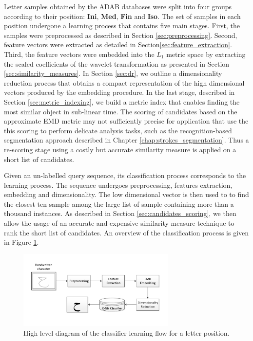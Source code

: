 \iftoggle{edit-mode}{\hspace{0pt}\marginpar{The learning process}}{}
Letter samples obtained by the ADAB databases were split into four groups according to their position: \textbf{Ini}, \textbf{Med}, \textbf{Fin} and \textbf{Iso}. 
The set of samples in each position undergone a learning process that contains five main stages.
First, the samples were preprocessed as described in Section \ref{sec:preprocessing}.
Second, feature vectors were extracted as detailed in Section\ref{sec:feature_extraction}.
Third, the feature vectors were embedded into the $L_1$ metric space by extracting the scaled coefficients of the wavelet transformation as presented in Section \ref{sec:similarity_measures}. 
In Section \ref{sec:dr}, we outline a dimensionality reduction process that obtains a compact representation of the high dimensional vectors produced by the embedding procedure.
In the last stage, described in Section \ref{sec:metric_indexing}, we build a metric index that enables finding the most similar object in sub-linear time.
The scoring of candidates based on the approximate EMD metric may not sufficiently precise for application that use the this scoring to perform delicate analysis tasks, such as the recognition-based segmentation approach described in Chapter \ref{chap:strokes_segmentation}.
Thus a re-scoring stage using a costly but accurate similarity measure is applied on a short list of candidates.   

\iftoggle{edit-mode}{\hspace{0pt}\marginpar{The recognition process}}{}
Given an un-labelled query sequence, its classification process corresponds to the learning process.
The sequence undergoes preprocessing, features extraction, embedding and dimensionality.
The low dimensional vector is then used to to find the closest ten sample among the large list of sample containing more than a thousand instances.
As described in Section \ref{sec:candidates_scoring}, we then allow the usage of an accurate and expensive similarity measure technique to rank the short list of candidates. 
An overview of the classification process is given in Figure \ref{fig:letters_classifier_learning_flow}.

\begin{figure}
\centering
\includegraphics[width=0.7\textwidth]{./figures/letters_classifier_learning_flow}       
\caption{High level diagram of the classifier learning flow for a letter position.}
\label{fig:letters_classifier_learning_flow}
\end{figure}


